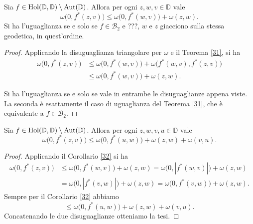 \begin{cor} \label{32}
  Sia $f \in \text{\normalfont{Hol}}(\mathbb{D},\mathbb{D})\setminus\text{\normalfont{Aut}}(\mathbb{D})$. Allora per ogni $z, w, v \in \mathbb{D}$ vale
  \begin{equation}
    \omega\bigl(0, f^*(z,v)\bigr) \le \omega\bigl(0,f^*(w,v)\bigr)+\omega(z,w).
  \end{equation}
  Si ha l'uguaglianza se e solo se $f \in \mathcal{B}_2$ e ???, $w$ e $z$ giacciono sulla stessa geodetica, in quest'ordine.
\end{cor}

\begin{proof}
  Applicando la disuguaglianza triangolare per $\omega$ e il Teorema \ref{31}, si ha
  \begin{align*}
    \omega\bigl(0,f^*(z,v)\bigr) & \le \omega\bigl(0,f^*(w,v)\bigr)+\omega\bigl(f^*(w,v),f^*(z,v)\bigr) \\
    & \le \omega\bigl(0,f^*(w,v)\bigr)+\omega(z,w).
  \end{align*}

  Si ha l'uguaglianza se e solo se vale in entrambe le disuguaglianze appena viste. La seconda è esattamente il caso di uguaglianza del Teorema \ref{31}, che è equivalente a $f \in \mathcal{B}_2$.
\end{proof}

\begin{cor} \label{33}
  Sia $f \in \text{\normalfont{Hol}}(\mathbb{D},\mathbb{D})\setminus\text{\normalfont{Aut}}(\mathbb{D})$. Allora per ogni $z, w, v, u \in \mathbb{D}$ vale
  \begin{equation}
    \omega\bigl(0, f^*(z,v)\bigr) \le \omega\bigl(0, f^*(u,w)\bigr)+\omega(z,w)+\omega(v,u).
  \end{equation}
\end{cor}
\begin{proof}
  Applicando il Corollario \ref{32} si ha
  \begin{align*}
    \omega\bigl(0,f^*(z,v)\bigr) & \le \omega\bigl(0,f^*(w,v)\bigr)+\omega(z,w) =\omega\bigl(0,|f^*(w,v)|\bigr)+\omega(z,w) \\
    & =\omega\bigl(0,|f^*(v,w)|\bigr)+\omega(z,w)=\omega\bigl(0,f^*(v,w)\bigr)+\omega(z,w).
  \end{align*}
  Sempre per il Corollario \ref{32} abbiamo
  $$\le \omega\bigl(0,f^*(u,w)\bigr)+\omega(z,w)+\omega(v,u).$$
  Concatenando le due disuguaglianze otteniamo la tesi.
\end{proof}


